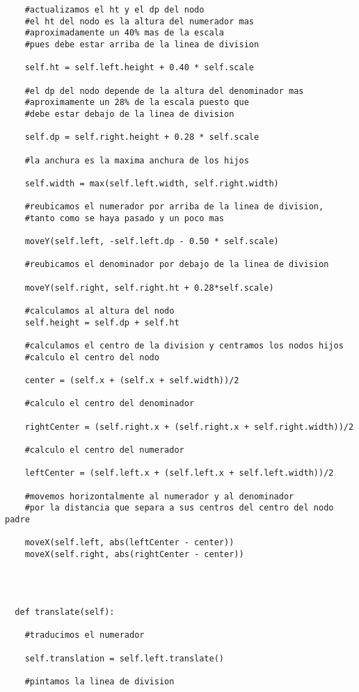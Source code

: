 \begin{verbatim}
    #actualizamos el ht y el dp del nodo
    #el ht del nodo es la altura del numerador mas 
    #aproximadamente un 40% mas de la escala 
    #pues debe estar arriba de la linea de division

    self.ht = self.left.height + 0.40 * self.scale

    #el dp del nodo depende de la altura del denominador mas
    #aproximamente un 28% de la escala puesto que 
    #debe estar debajo de la linea de division

    self.dp = self.right.height + 0.28 * self.scale
    
    #la anchura es la maxima anchura de los hijos

    self.width = max(self.left.width, self.right.width)

    #reubicamos el numerador por arriba de la linea de division,
    #tanto como se haya pasado y un poco mas

    moveY(self.left, -self.left.dp - 0.50 * self.scale)
    
    #reubicamos el denominador por debajo de la linea de division

    moveY(self.right, self.right.ht + 0.28*self.scale)

    #calculamos al altura del nodo
    self.height = self.dp + self.ht

    #calculamos el centro de la division y centramos los nodos hijos
    #calculo el centro del nodo

    center = (self.x + (self.x + self.width))/2

    #calculo el centro del denominador

    rightCenter = (self.right.x + (self.right.x + self.right.width))/2

    #calculo el centro del numerador

    leftCenter = (self.left.x + (self.left.x + self.left.width))/2

    #movemos horizontalmente al numerador y al denominador
    #por la distancia que separa a sus centros del centro del nodo padre

    moveX(self.left, abs(leftCenter - center))
    moveX(self.right, abs(rightCenter - center))


      
    
  def translate(self):

    #traducimos el numerador

    self.translation = self.left.translate()

    #pintamos la linea de division


\end{verbatim}
